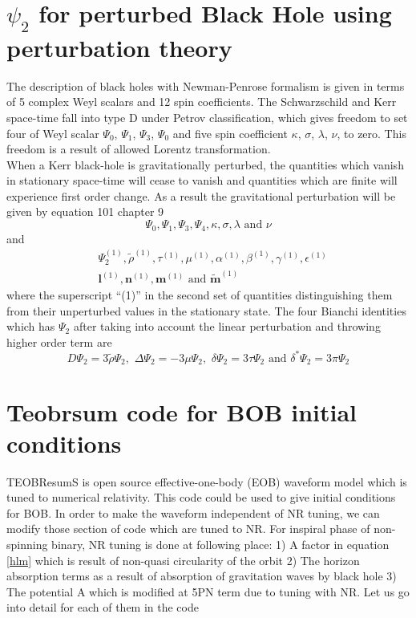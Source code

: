 \documentclass[prd,preprintnumbers,onecolumn,eqsecnum,floatfix,letter]{revtex4}
\begin{document}
\section{$\psi_{2}$ for perturbed Black Hole using perturbation theory}
The description of black holes with Newman-Penrose formalism is given in terms of 5 complex Weyl scalars and 12 spin coefficients. The Schwarzschild and Kerr space-time fall into type D under Petrov classification, which gives freedom to set four of Weyl scalar $\Psi_0$, $\Psi_1$, $\Psi_3$, $\Psi_0$ and five spin coefficient $\kappa$, $\sigma$, $\lambda$, $\nu$,  to zero. This freedom is a result of allowed Lorentz transformation. \\
When a Kerr black-hole is gravitationally perturbed, the quantities which vanish in stationary space-time will cease to vanish and quantities which are finite will experience first order change. As a result the gravitational perturbation will be given by equation 101 chapter 9 \cite{Chandrasekhar:579245}      
\begin{equation}
\Psi_0, \Psi_1, \Psi_3, \Psi_4, \kappa, \sigma, \lambda \, \, \text{and} \, \,\nu
\end{equation}
and 
\begin{align}
&\Psi_{2}^{\left(1\right)}, \tilde{\rho}^{\left(1\right)}, \tau^{\left(1\right)}, \mu^{\left(1\right)}, \alpha^{\left(1\right)}, \beta^{\left(1\right)}, \gamma^{\left(1\right)}, \epsilon^{\left(1\right)} \nonumber \\
&\boldsymbol{l}^{\left(1\right)}, \boldsymbol{n}^{\left(1\right)}, \boldsymbol{m}^{\left(1\right)} \,\, \text{and} \,\, \boldsymbol{\tilde{m}}^{\left(1\right)}
\end{align}
where the superscript ``(1)'' in the second set of quantities distinguishing them from their unperturbed values in the stationary state. The four Bianchi identities which has $\Psi_{2}$ after taking into account the linear perturbation and throwing higher order term are 
\begin{equation}
D\Psi_{2} = 3\tilde{\rho}\Psi_{2}, \,\, \Delta\Psi_{2} = -3\mu\Psi_{2},  \,\, \delta\Psi_{2} = 3\tau\Psi_{2} \,\, \text{and} \,\, \delta^{*}\Psi_{2} = 3\pi\Psi_{2}
\end{equation}  
\section{Teobrsum code for BOB initial conditions}
TEOBResumS \cite{Nagar2018PhRD} is open source effective-one-body (EOB) waveform model which is tuned to numerical relativity. This code could be used to give initial conditions for BOB. In order to make the waveform independent of NR tuning, we can modify those section of code which are tuned to NR. For inspiral phase of non-spinning binary, NR tuning is done at following place: 1) A factor in equation \ref{hlm} which is result of non-quasi circularity of the orbit 2) The horizon absorption terms as a result of absorption of gravitation waves by black hole 3) The potential A which is modified at 5PN term due to tuning with NR. Let us go into detail for each of them in the code
\end{document}
